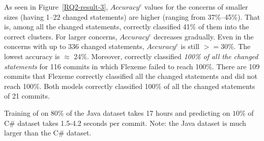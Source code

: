 \vspace{2pt}
 As seen in
Figure~\ref{RQ2-result-3}, $Accuracy^{c}$ values for the concerns of
smaller sizes (having 1--22 changed statements) are higher (ranging
from 37\%--45\%). That is, among all the changed statements, {\tool}
correctly classified 41\% of them into the correct clusters. 
For larger concerns, $Accuracy^{c}$ decreases gradually. Even in
the concerns with up to 336 changed statements, $Accuracy^{c}$ is
still $>=$30\%. The lowest accuracy is $\approx$ 24\%.  Moreover,
{\tool} correctly classified {\em 100\% of all the changed statements}
for 116 commits in which Flexeme failed to reach 100\%. There are 109
commits that Flexeme correctly classified all the changed statements
and {\tool} did not reach 100\%. Both models correctly classified
100\% of all the changed statements of 21 commits.


Training of \tool on $80\%$ of the Java dataset takes 17 hours and
predicting on $10\%$ of C\# dataset takes 1.5-4.2 seconds per commit.
Note: the Java dataset is much larger than the C\# dataset.

